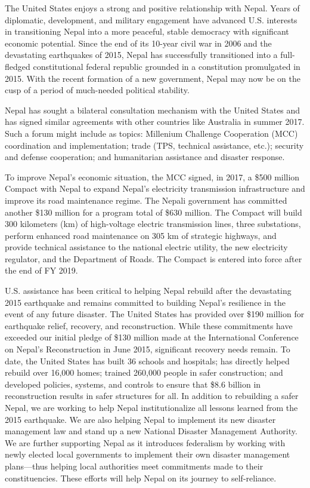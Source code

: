 \documentclass[
  openany]{book}
\begin{document}
The United States enjoys a strong and positive relationship with Nepal. Years of diplomatic, development, and military engagement have advanced U.S. interests in transitioning Nepal into a more peaceful, stable democracy with significant economic potential. Since the end of its 10-year civil war in 2006 and the devastating earthquakes of 2015, Nepal has successfully transitioned into a full-fledged constitutional federal republic grounded in a constitution promulgated in 2015. With the recent formation of a new government, Nepal may now be on the cusp of a period of much-needed political stability.

Nepal has sought a bilateral consultation mechanism with the United States and has signed similar agreements with other countries like Australia in summer 2017. Such a forum might include as topics: Millenium Challenge Cooperation (MCC) coordination and implementation; trade (TPS, technical assistance, etc.); security and defense cooperation; and humanitarian assistance and disaster response.

To improve Nepal's economic situation, the MCC signed, in 2017, a \$500 million Compact with Nepal to expand Nepal's electricity transmission infrastructure and improve its road maintenance regime. The Nepali government has committed another \$130 million for a program total of \$630 million. The Compact will build 300 kilometers (km) of high-voltage electric transmission lines, three substations, perform enhanced road maintenance on 305 km of strategic highways, and provide technical assistance to the national electric utility, the new electricity regulator, and the Department of Roads. The Compact is entered into force after the end of FY 2019.

U.S. assistance has been critical to helping Nepal rebuild after the devastating 2015 earthquake and remains committed to building Nepal's resilience in the event of any future disaster. The United States has provided over \$190 million for earthquake relief, recovery, and reconstruction. While these commitments have exceeded our initial pledge of \$130 million made at the International Conference on Nepal's Reconstruction in June 2015, significant recovery needs remain. To date, the United States has built 36 schools and hospitals; has directly helped rebuild over 16,000 homes; trained 260,000 people in safer construction; and developed policies, systems, and controls to ensure that \$8.6 billion in reconstruction results in safer structures for all. In addition to rebuilding a safer Nepal, we are working to help Nepal institutionalize all lessons learned from the 2015 earthquake. We are also helping Nepal to implement its new disaster management law and stand up a new National Disaster Management Authority. We are further supporting Nepal as it introduces federalism by working with newly elected local governments to implement their own disaster management plans---thus helping local authorities meet commitments made to their constituencies. These efforts will help Nepal on its journey to self-reliance.
\end{document}
